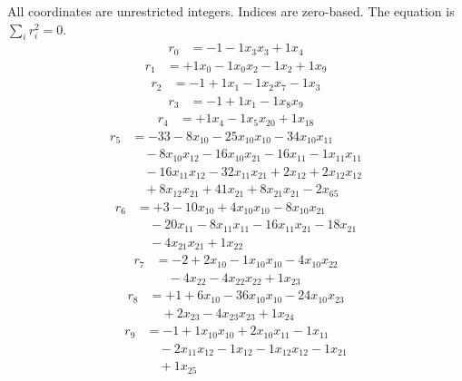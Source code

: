 \begingroup\small
All coordinates are unrestricted integers. Indices are zero-based. The equation is $\sum_i r_i^2=0$.
\[\begin{aligned}
r_{0} &= - 1 - 1 x_{3} x_{3} + 1 x_{4}
\end{aligned}\]
\[\begin{aligned}
r_{1} &= + 1 x_{0} - 1 x_{0} x_{2} - 1 x_{2} + 1 x_{9}
\end{aligned}\]
\[\begin{aligned}
r_{2} &= - 1 + 1 x_{1} - 1 x_{2} x_{7} - 1 x_{3}
\end{aligned}\]
\[\begin{aligned}
r_{3} &= - 1 + 1 x_{1} - 1 x_{8} x_{9}
\end{aligned}\]
\[\begin{aligned}
r_{4} &= + 1 x_{4} - 1 x_{5} x_{20} + 1 x_{18}
\end{aligned}\]
\[\begin{aligned}
r_{5} &= - 33 - 8 x_{10} - 25 x_{10} x_{10} - 34 x_{10} x_{11} \\
 &\quad - 8 x_{10} x_{12} - 16 x_{10} x_{21} - 16 x_{11} - 1 x_{11} x_{11} \\
 &\quad - 16 x_{11} x_{12} - 32 x_{11} x_{21} + 2 x_{12} + 2 x_{12} x_{12} \\
 &\quad + 8 x_{12} x_{21} + 41 x_{21} + 8 x_{21} x_{21} - 2 x_{65}
\end{aligned}\]
\[\begin{aligned}
r_{6} &= + 3 - 10 x_{10} + 4 x_{10} x_{10} - 8 x_{10} x_{21} \\
 &\quad - 20 x_{11} - 8 x_{11} x_{11} - 16 x_{11} x_{21} - 18 x_{21} \\
 &\quad - 4 x_{21} x_{21} + 1 x_{22}
\end{aligned}\]
\[\begin{aligned}
r_{7} &= - 2 + 2 x_{10} - 1 x_{10} x_{10} - 4 x_{10} x_{22} \\
 &\quad - 4 x_{22} - 4 x_{22} x_{22} + 1 x_{23}
\end{aligned}\]
\[\begin{aligned}
r_{8} &= + 1 + 6 x_{10} - 36 x_{10} x_{10} - 24 x_{10} x_{23} \\
 &\quad + 2 x_{23} - 4 x_{23} x_{23} + 1 x_{24}
\end{aligned}\]
\[\begin{aligned}
r_{9} &= - 1 + 1 x_{10} x_{10} + 2 x_{10} x_{11} - 1 x_{11} \\
 &\quad - 2 x_{11} x_{12} - 1 x_{12} - 1 x_{12} x_{12} - 1 x_{21} \\
 &\quad + 1 x_{25}
\end{aligned}\]
